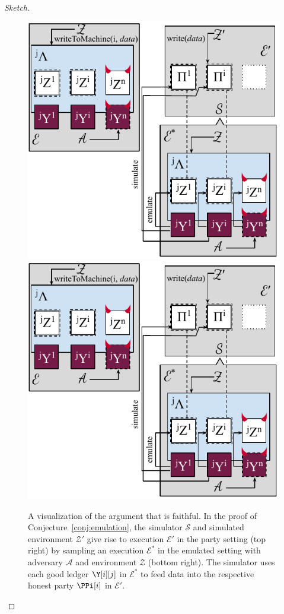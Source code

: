 \begin{proof}[Sketch]
  \begin{figure}
    \centering
    \iftwocolumn
    \includegraphics[width=0.9 \columnwidth,keepaspectratio]{figures/rollerblade-emulation.pdf}
    \else
    \includegraphics[width=0.7 \columnwidth,keepaspectratio]{figures/rollerblade-emulation.pdf}
    \fi
    \caption{A visualization of the argument that \rollerblade is faithful.
    In the proof of Conjecture~\ref{conj:emulation},
    the simulator $\mathcal{S}$ and simulated environment $\mathcal{Z}'$
    give rise to execution $\mathcal{E}'$ in the
    party setting (top right) by sampling an execution $\mathcal{E}^*$ in the emulated
    setting with adversary $\mathcal{A}$ and environment $\mathcal{Z}$
    (bottom right). The simulator uses each good ledger $\Y[i][j]$ in
    $\mathcal{E}^*$ to feed data into the respective honest party $\PPi[i]$
    in $\mathcal{E}'$. }
    \label{fig.conj.simulation}
  \end{figure}


\end{proof}
